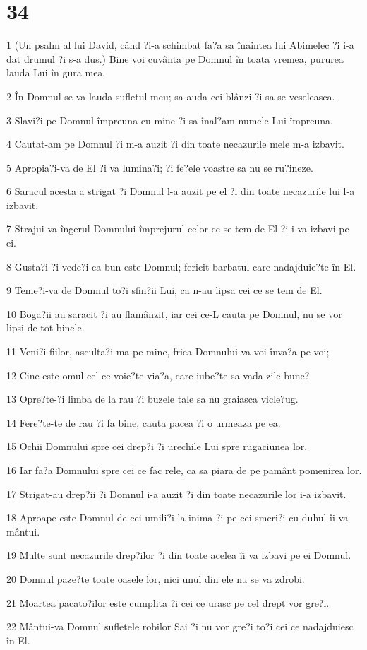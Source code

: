 \chapter{34}

\par 1 (Un psalm al lui David, când ?i-a schimbat fa?a sa înaintea lui Abimelec ?i i-a dat drumul ?i s-a dus.) Bine voi cuvânta pe Domnul în toata vremea, pururea lauda Lui în gura mea.
\par 2 În Domnul se va lauda sufletul meu; sa auda cei blânzi ?i sa se veseleasca.
\par 3 Slavi?i pe Domnul împreuna cu mine ?i sa înal?am numele Lui împreuna.
\par 4 Cautat-am pe Domnul ?i m-a auzit ?i din toate necazurile mele m-a izbavit.
\par 5 Apropia?i-va de El ?i va lumina?i; ?i fe?ele voastre sa nu se ru?ineze.
\par 6 Saracul acesta a strigat ?i Domnul l-a auzit pe el ?i din toate necazurile lui l-a izbavit.
\par 7 Strajui-va îngerul Domnului împrejurul celor ce se tem de El ?i-i va izbavi pe ei.
\par 8 Gusta?i ?i vede?i ca bun este Domnul; fericit barbatul care nadajduie?te în El.
\par 9 Teme?i-va de Domnul to?i sfin?ii Lui, ca n-au lipsa cei ce se tem de El.
\par 10 Boga?ii au saracit ?i au flamânzit, iar cei ce-L cauta pe Domnul, nu se vor lipsi de tot binele.
\par 11 Veni?i fiilor, asculta?i-ma pe mine, frica Domnului va voi înva?a pe voi;
\par 12 Cine este omul cel ce voie?te via?a, care iube?te sa vada zile bune?
\par 13 Opre?te-?i limba de la rau ?i buzele tale sa nu graiasca vicle?ug.
\par 14 Fere?te-te de rau ?i fa bine, cauta pacea ?i o urmeaza pe ea.
\par 15 Ochii Domnului spre cei drep?i ?i urechile Lui spre rugaciunea lor.
\par 16 Iar fa?a Domnului spre cei ce fac rele, ca sa piara de pe pamânt pomenirea lor.
\par 17 Strigat-au drep?ii ?i Domnul i-a auzit ?i din toate necazurile lor i-a izbavit.
\par 18 Aproape este Domnul de cei umili?i la inima ?i pe cei smeri?i cu duhul îi va mântui.
\par 19 Multe sunt necazurile drep?ilor ?i din toate acelea îi va izbavi pe ei Domnul.
\par 20 Domnul paze?te toate oasele lor, nici unul din ele nu se va zdrobi.
\par 21 Moartea pacato?ilor este cumplita ?i cei ce urasc pe cel drept vor gre?i.
\par 22 Mântui-va Domnul sufletele robilor Sai ?i nu vor gre?i to?i cei ce nadajduiesc în El.

